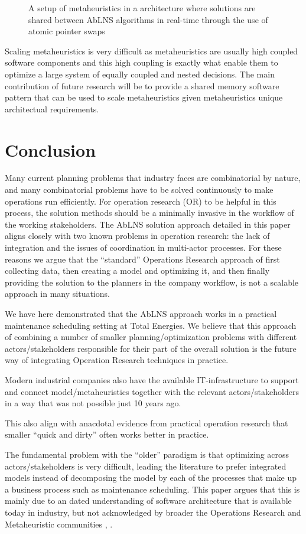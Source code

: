 \begin{figure}
	
	\drawModelSetupHexagon[metaheuristics=true]
	\caption{A setup of metaheuristics in a architecture where solutions are shared 
		between AbLNS algorithms in real-time through the use of atomic pointer swaps
	}\label{fig:discussion:hexagon-setup}
\end{figure}

Scaling metaheuristics is very difficult as metaheuristics are usually high coupled
software components and this high coupling is exactly what enable them to optimize
a large system of equally coupled and nested decisions. The main contribution of 
future research will be to provide a shared memory software pattern that can be 
used to scale metaheuristics given metaheuristics unique architectual requirements.

\section{Conclusion}
Many current planning problems that industry faces are combinatorial by
nature, and many combinatorial problems have to be solved continuously to
make operations run efficiently. For operation research (OR) to be helpful
in this process, the solution methods should be a minimally invasive in the
workflow of the working stakeholders. The AbLNS solution approach detailed in
this paper aligns closely with two known problems in operation research: the
lack of integration and the issues of coordination in multi-actor processes.
For these reasons we argue that the ``standard'' Operations Research approach
of first collecting data, then creating a model and optimizing it, and then
finally providing the solution to the planners in the company workflow, is not a
scalable approach in many situations.

We have here demonstrated that the AbLNS approach works in a practical
maintenance scheduling setting at Total Energies. We believe that this approach
of combining a number of smaller planning/optimization problems with different
actors/stakeholders responsible for their part of the overall solution is the
future way of integrating Operation Research techniques in practice.

Modern industrial companies also have the available IT-infrastructure to support
and connect model/metaheuristics together with the relevant actors/stakeholders
in a way that was not possible just 10 years ago.

This also align with anacdotal evidence from practical operation research 
that smaller ``quick and dirty'' often works better in practice. 

The fundamental problem with the ``older'' paradigm is that optimizing across
actors/stakeholders is very difficult, leading the literature to prefer
integrated models instead of decomposing the model by each of the
processes that make up a business process such as maintenance scheduling.
This paper argues that this is mainly due to an dated understanding of
software architecture that is available today in industry, but not
acknowledged by broader the Operations Research and Metaheuristic
communities \citep{talbiMetaheuristicsDesignImplementation2009},
\citep{gendreauHandbookMetaheuristics2019}.
